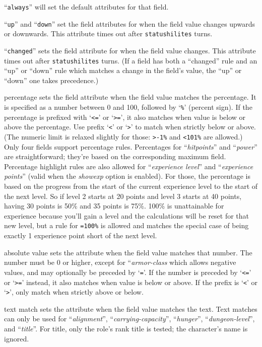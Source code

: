 \blist{}
\item{\bb{}}
``{\tt always}'' will set the default attributes for that field.
\item{\bb{}}
``{\tt up}'' and ``{\tt down}'' set the field attributes for when the field
value changes upwards or downwards. This attribute times out after
{\tt statushilites} turns.
\item{\bb{}}
``{\tt changed}'' sets the field attribute for when the field value
changes. This attribute times out after {\tt statushilites} turns.
(If a field has both a ``changed'' rule and an ``up'' or ``down''
rule which matches a change in the field's value,
the ``up'' or ``down'' one takes precedence.)
\item{\bb{}}
percentage sets the field attribute when the field value
matches the percentage.
It is specified as a number between 0 and 100, followed by `{\tt \%}'
(percent sign).
If the percentage is prefixed with `{\tt <=}' or `{\tt >=}',
it also matches when value is below or above the percentage.
Use prefix `{\tt <}' or `{\tt >}' to match when strictly below or above.
(The numeric limit is relaxed slightly for those: {\tt >-1\%}
and {\tt <101\%} are allowed.)
Only four fields support percentage rules.
Percentages for ``{\it hitpoints\/}'' and ``{\it power\/}'' are
straightforward; they're based on the corresponding maximum field.
Percentage highlight rules are also allowed for ``{\it experience level\/}''
and ``{\it experience points\/}'' (valid when the
{\it showexp\/}
option is enabled).
For those, the percentage is based on the progress from the start of
the current experience level to the start of the next level.
So if level 2 starts at 20 points and level 3 starts at 40 points,
having 30 points is 50\% and 35 points is 75\%.
100\% is unattainable for experience because you'll gain a level and
the calculations will be reset for that new level, but a rule for
{\tt =100\%} is allowed and matches the special case of being
exactly 1 experience point short of the next level.
\item{\bb{}}
absolute value sets the attribute when the field value
matches that number.
The number must be 0 or higher, except for ``{\it armor-class\/} which
allows negative values, and may optionally be preceded by `{\tt =}'.
If the number is preceded by `{\tt <=}' or `{\tt >=}' instead,
it also matches when value is below or above.
If the prefix is `{\tt <}' or `{\tt >}', only match when strictly
above or below.
\item{\bb{}}
text match sets the attribute when the field value matches the text.
Text matches can only be used for ``{\it alignment\/}'',
``{\it carrying-capacity\/}'', ``{\it hunger\/}'', ``{\it dungeon-level\/}'',
and ``{\it title\/}''.
For title, only the role's rank title
is tested; the character's name is ignored.
\elist

